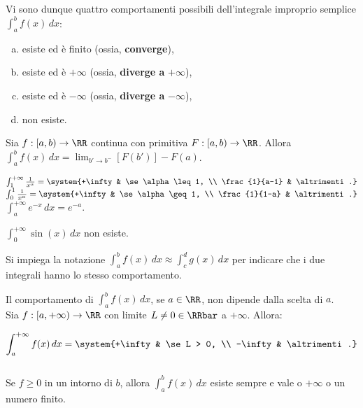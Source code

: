 \documentclass[11pt]{article}
\begin{document}
	Vi sono dunque quattro comportamenti possibili dell'integrale improprio
	semplice $\int_a^b f(x) \, dx$:
	
	\begin{enumerate}[(a)]
		\item esiste ed è finito (ossia, \textbf{converge}),
		
		\item esiste ed è $+\infty$ (ossia, \textbf{diverge a} $+\infty$),
		
		\item esiste ed è $-\infty$ (ossia, \textbf{diverge a} $-\infty$),
		
		\item non esiste.
	\end{enumerate}

	\begin{remark} Sia $f : [a, b) \to \RR$ continua con primitiva $F : [a, b) \to \RR$. Allora $\int_a^b f(x) \, dx = \lim_{b' \to b^-} [F(b')] - F(a)$.
	\end{remark}
	
	\begin{example}\nl
		\li $\int_1^{+\infty} \frac{1}{x^\alpha} = \system{+\infty & \se \alpha \leq 1, \\ \frac{1}{a-1} & \altrimenti.}$ \\
		
		\li  $\int_0^{1} \frac{1}{x^\alpha} = \system{+\infty & \se \alpha \geq 1, \\ \frac{1}{1-a} & \altrimenti.}$ \\
		
		\li $\int_a^{+\infty} e^{-x} \, dx = e^{-a}$.
		
		\li $\int_0^{+\infty} \sin(x) \, dx$ non esiste.
	\end{example}

	\begin{note}
		Si impiega la notazione $\int_a^b f(x) \, dx \approx \int_c^d g(x) \, dx$ per indicare che i due integrali hanno lo stesso comportamento.
	\end{note}

	\begin{remark}\nl
		\li Il comportamento di $\int_a^b f(x) \, dx$, se $a \in \RR$, non dipende
		dalla scelta di $a$. \\
		
		\li Sia $f: [a, +\infty) \to \RR$ con limite $L \neq 0 \in \RRbar$ a $+\infty$.
		Allora:
		
		\[ \int_a^{+\infty} f(x) \, dx = \system{+\infty & \se L > 0, \\ -\infty & \altrimenti.} \] \\ %
		
		\li Se $f \geq 0$ in un intorno di $b$, allora $\int_a^b f(x) \, dx$
		esiste sempre e vale o $+\infty$ o un numero finito. %
	\end{remark}
\end{document}
